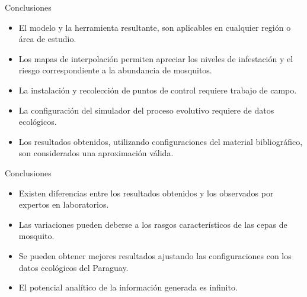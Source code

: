 \begin{frame}[t]{Conclusiones}
    \begin{itemize}
        \item El modelo y la herramienta resultante, son aplicables en cualquier región o área de estudio.

        \item Los mapas de interpolación permiten apreciar los niveles de infestación y el riesgo correspondiente a la abundancia de mosquitos.

        \item La instalación y recolección de puntos de control requiere trabajo de campo.

        \item La configuración del simulador del proceso evolutivo requiere de datos ecológicos.

        \item Los resultados obtenidos, utilizando configuraciones del material bibliográfico, son considerados una aproximación válida.

    \end{itemize}
\end{frame}

\begin{frame}[t]{Conclusiones}
    \begin{itemize}
        \item Existen diferencias entre los resultados obtenidos y los observados por expertos en laboratorios.

        \item Las variaciones pueden deberse a los rasgos característicos de las cepas de mosquito.

        \item Se pueden obtener mejores resultados ajustando las configuraciones con los datos ecológicos del Paraguay.

        \item El potencial analítico de la información generada es infinito.
    \end{itemize}
\end{frame}
